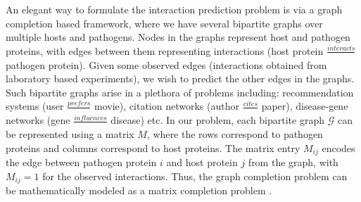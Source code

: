 \documentclass[runningheads,a4paper]{llncs}
\begin{document}
An elegant way to formulate the interaction prediction problem is via a graph completion based framework, where we have several bipartite 
graphs over multiple hosts and pathogens.%
Nodes in the graphs represent host and pathogen proteins, with edges between them representing interactions 
(host protein $\frac{interacts}{}$ pathogen protein).
Given some observed edges (interactions obtained from laboratory based experiments), we wish to predict the other edges in the graphs.
Such bipartite graphs arise in a plethora of problems including: recommendation systems (user $\frac{prefers}{}$ movie), 
citation networks (author $\frac{cites}{}$ paper), disease-gene networks (gene $\frac{influences}{}$ disease) etc. 
In our problem, each bipartite graph $\mathcal{G}$ can be represented using a matrix $M$, where the rows correspond to pathogen proteins 
and columns correspond to host proteins.
The matrix entry $M_{ij}$ encodes the edge between pathogen protein $i$ and host protein $j$ from the graph, with $M_{ij}=1$ for the observed interactions. 
Thus, the graph completion problem can be mathematically modeled as a matrix completion problem \cite{candes08}. 
\end{document}
